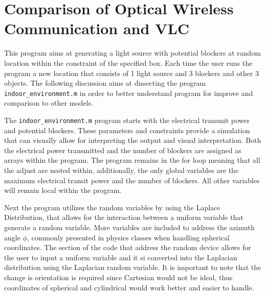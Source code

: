 \section{Comparison of Optical Wireless Communication and VLC}

This program aims at generating a light source with potential blockers at random location within the constraint of the specified box. Each time the user runs the program a new location that consists of 1 light source and 3 blockers and other 3 objects. The following discussion aims at dissecting the program \verb|indoor_environment.m| in order to better understand program for improve and comparison to other models.

The \verb|indoor_environment.m| program starts with the electrical transmit power and potential blockers. These parameters and constraints provide a simulation that can visually allow for interpreting the output and visual interpretation. Both the electrical power transmitted and the number of blockers are assigned as arrays within the program. The program remains in the for loop meaning that all the adjust are nested within, additionally, the only global variables are the maximum electrical transit power and the number of blockers. All other variables will remain local within the program.

Next the program utilizes the random variables by using the Laplace Distribution, that allows for the interaction between a uniform variable that generate a random variable. More variables are included to address the azimuth angle $\phi$, commonly presented in physics classes when handling spherical coordinates. The section of the code that address the random device allows for the user to input a uniform variable and it si converted into the Laplacian distribution using the Laplacian random variable. It is important to note that the change is orientation is required since Cartesian would not be ideal, thus coordinates of spherical and cylindrical would work better and easier to handle.

